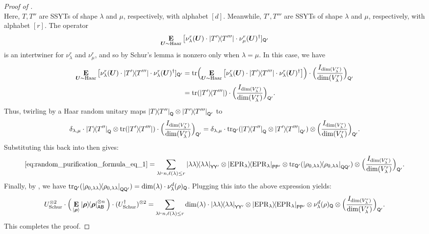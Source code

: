 \begin{proof}[Proof of ]
\begin{equation*}
    \end{equation*}
    Here, $T, T''$ are SSYTs of shape $\lambda$ and $\mu$, respectively, with alphabet $[d]$. Meanwhile, $T', T'''$ are SSYTs of shape $\lambda$ and $\mu$, respectively, with alphabet $[r]$. The operator
    \begin{equation*}
        \mathop{\bf E\/}_{\boldsymbol{U} \sim \mathrm{Haar}} \big[ \nu^r_\lambda(\boldsymbol{U}) \cdot \ketbra{T'}{T'''} \cdot \nu^r_\mu(\boldsymbol{U})^\dagger]_{\mathsf{Q'}}
    \end{equation*}
    is an intertwiner for $\nu_\lambda^r$ and $\nu_\mu^r$, and so by Schur's lemma is nonzero only when $\lambda = \mu$. In this case, we have 
    \begin{align*}
        \mathop{\bf E\/}_{\boldsymbol{U} \sim \mathrm{Haar}} \big[ \nu^r_\lambda(\boldsymbol{U}) \cdot \ketbra{T'}{T'''} \cdot \nu^r_\lambda(\boldsymbol{U})^\dagger]_{\mathsf{Q'}} & = \tr(\mathop{\bf E\/}_{\boldsymbol{U} \sim \mathrm{Haar}} \big[ \nu^r_\lambda(\boldsymbol{U}) \cdot \ketbra{T'}{T'''} \cdot \nu^r_\lambda(\boldsymbol{U})^\dagger \big]) \cdot \Big(\frac{I_{\dim(V^r_\lambda)}}{\dim(V^r_\lambda)}\Big)_{\mathsf{Q'}} \\
        & = \tr( \ketbra{T'}{T'''} ) \cdot \Big(\frac{I_{\dim(V^r_\lambda)}}{\dim(V^r_\lambda)}\Big)_{\mathsf{Q'}}.
    \end{align*}
    Thus, twirling by a Haar random unitary maps 
    $\ketbra{T}{T''}_{\mathsf{Q}} \otimes \ketbra{T'}{T'''}_{\mathsf{Q'}}$ to
    \begin{equation*}
    \delta_{\lambda,\mu} \cdot \ketbra{T}{T''}_{\mathsf{Q}} \otimes \tr(\ketbra{T'}{T'''}) \cdot \Big(\frac{I_{\dim(V^r_\lambda)}}{\dim(V^r_\lambda)}\Big)_{\mathsf{Q'}}  = \delta_{\lambda,\mu} \cdot \tr_{\mathsf{Q'}}( \ketbra{T}{T''}_{\mathsf{Q}} \otimes \ketbra{T'}{T'''}_{\mathsf{Q'}}) \otimes \Big(\frac{I_{\dim(V^r_\lambda)}}{\dim(V^r_\lambda)}\Big)_{\mathsf{Q'}}.\end{equation*}
Substituting this back into  then gives:
    \begin{equation*}
        \eqref{eq:random_purification_formula_eq_1} = \sum_{\lambda \vdash n, \ell(\lambda) \leq r } \ketbra{\lambda \lambda}{\lambda \lambda}_{\mathsf{YY'}} \otimes \ketbra{\mathrm{EPR}_{\lambda}}{\mathrm{EPR}_{\lambda}}_{\mathsf{PP'}} \otimes \tr_{\mathsf{Q'}}( \ketbra{\rho_{0,\lambda\lambda}}_{\mathsf{QQ'}}) \otimes\Big(\frac{I_{\dim(V^r_\lambda)}}{\dim(V^r_\lambda)}\Big)_{\mathsf{Q'}}.
    \end{equation*}
    Finally, by , we have $\tr_{\mathsf{Q'}}(\ketbra{\rho_{0,\lambda\lambda}}_{\mathsf{QQ'}}) = \dim(\lambda) \cdot \nu_\lambda^d(\rho)_{\mathsf{Q}}$. Plugging this into the above expression yields:
    \begin{equation*} 
    U_{\mathrm{Schur}}^{\otimes 2} \cdot\Big(\mathop{\bf E\/}_{\ket{\boldsymbol{\rho}}} \ketbra{\boldsymbol{\rho}}_{\mathsf{AB}}^{\otimes n}\Big) \cdot (U_{\mathrm{Schur}}^\dagger)^{\otimes 2}
        = \sum_{\lambda \vdash n, \ell(\lambda)\leq r} \dim(\lambda) \cdot \ketbra{\lambda\lambda}_{\mathsf{Y} \mathsf{Y'}} \otimes \ketbra{\mathrm{EPR}_{\lambda}}_{\mathsf{P}\mathsf{P'}} \otimes \nu^d_{\lambda}(\rho)_{\mathsf{Q}} \otimes \Big(\frac{I_{\dim(V_{\lambda}^r)}}{\dim(V_{\lambda}^r)}\Big)_{\mathsf{Q'}}.
\end{equation*}
This completes the proof. \qedhere
    

\end{proof}
